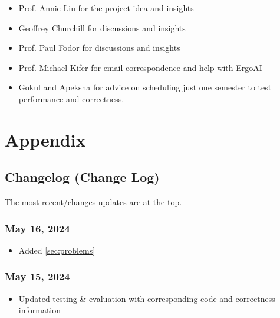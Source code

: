 \documentclass[12pt]{article}
\newcommand*{\fullref}[1]{\hyperref[{#1}]{\autoref*{#1} \nameref*{#1}}}
\begin{document}
    \begin{itemize}
        \item Prof. Annie Liu for the project idea and insights
        \item Geoffrey Churchill for discussions and insights
        \item Prof. Paul Fodor for discussions and insights
        \item Prof. Michael Kifer for email correspondence and help with ErgoAI
        \item Gokul and Apeksha for advice on scheduling just one semester to test performance and correctness.
    \end{itemize}
    
    \newpage
    
    
    
    

    \newpage
    
    \section{Appendix}
    \label{sec:appendix}

    \subsection{Changelog (Change Log)}
    \label{subsec:change}

    The most recent/changes updates are at the top.

    \subsubsection*{May 16, 2024}

    \begin{itemize}
        \item Added \fullref{sec:problems}
    \end{itemize}

    \subsubsection*{May 15, 2024}

    \begin{itemize}
        \item Updated testing \& evaluation with corresponding code and correctness information
    \end{itemize}
\end{document}
